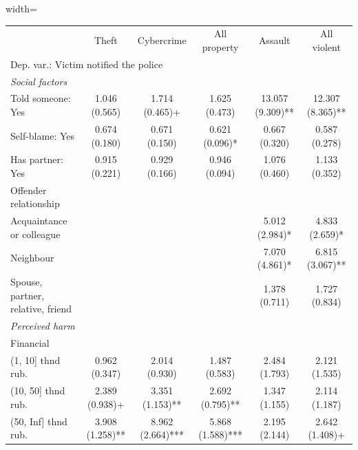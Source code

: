 	\begin{adjustbox}{width=\textwidth}
	\begin{tabular}{lccccc}
		\toprule
		& Theft & Cybercrime & All property & Assault & All violent\\
		\multicolumn{6}{l}{Dep. var.: Victim notified the police }\\
		\midrule
		\textit{Social factors} & & & & & \\
		Told someone: Yes & \num{1.046} (\num{0.565}) & \num{1.714} (\num{0.465})+ & \num{1.625} (\num{0.473}) & \num{13.057} (\num{9.309})** & \num{12.307} (\num{8.365})**\\
		Self-blame: Yes & \num{0.674} (\num{0.180}) & \num{0.671} (\num{0.150}) & \num{0.621} (\num{0.096})* & \num{0.667} (\num{0.320}) & \num{0.587} (\num{0.278})\\
		Has partner: Yes & \num{0.915} (\num{0.221}) & \num{0.929} (\num{0.166}) & \num{0.946} (\num{0.094}) & \num{1.076} (\num{0.460}) & \num{1.133} (\num{0.352})\\
		Offender relationship & & & & & \\
		\hspace{3mm}Acquaintance or colleague &  &  &  & \num{5.012} (\num{2.984})* & \num{4.833} (\num{2.659})*\\
		\hspace{3mm}Neighbour &  &  &  & \num{7.070} (\num{4.861})* & \num{6.815} (\num{3.067})**\\
		\hspace{3mm}Spouse, partner, relative, friend &  &  &  & \num{1.378} (\num{0.711}) & \num{1.727} (\num{0.834})\\
		\midrule
		\textit{Perceived harm} & & & & & \\
		Financial & & & & & \\
		\hspace{3mm}(1, 10]   thnd rub. & \num{0.962} (\num{0.347}) & \num{2.014} (\num{0.930}) & \num{1.487} (\num{0.583}) & \num{2.484} (\num{1.793}) & \num{2.121} (\num{1.535})\\
		\hspace{3mm}(10, 50]  thnd rub. & \num{2.389} (\num{0.938})+ & \num{3.351} (\num{1.153})** & \num{2.692} (\num{0.795})** & \num{1.347} (\num{1.155}) & \num{2.114} (\num{1.187})\\
		\hspace{3mm}(50, Inf] thnd rub. & \num{3.908} (\num{1.258})** & \num{8.962} (\num{2.664})*** & \num{5.868} (\num{1.588})*** & \num{2.195} (\num{2.144}) & \num{2.642} (\num{1.408})+\\

\end{tabular}
\end{adjustbox}
